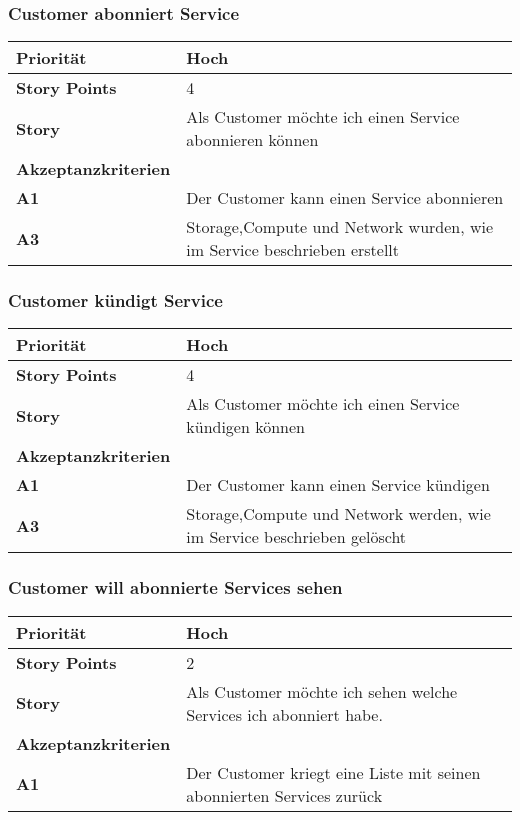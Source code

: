  \subsubsection{Customer abonniert Service}
\begin{tabularx}{\linewidth}{l X}
  \textbf{Priorität} & Hoch\\
  \hline
  \textbf{Story Points} & 4\\
  \hline
  \textbf{Story}& Als Customer möchte ich einen Service abonnieren können\\
  \hline
    \textbf{Akzeptanzkriterien} & \\
    \hline
  \textbf{A1} & Der Customer kann einen Service abonnieren\\
  \hline
    \textbf{A3} & Storage,Compute und Network wurden, wie im Service beschrieben erstellt\\
  \hline  
     \end{tabularx}

 

 \subsubsection{Customer kündigt Service}
 \begin{tabularx}{\linewidth}{l X}
     \textbf{Priorität} & Hoch\\
  \hline
  \textbf{Story Points} & 4\\
  \hline
  \textbf{Story}& Als Customer möchte ich einen Service kündigen können\\
  \hline
    \textbf{Akzeptanzkriterien} & \\
    \hline
  \textbf{A1} & Der Customer kann einen Service kündigen\\
  \hline
    \textbf{A3} & Storage,Compute und Network werden, wie im Service beschrieben gelöscht\\
  \hline
   \end{tabularx}

\subsubsection{Customer will abonnierte Services sehen}
\begin{tabularx}{\linewidth}{l X}
  \textbf{Priorität} & Hoch\\
  \hline
  \textbf{Story Points} & 2\\
  \hline
  \textbf{Story}& Als Customer möchte ich sehen welche Services ich abonniert habe.\\
  \hline
    \textbf{Akzeptanzkriterien} & \\
    \hline
  \textbf{A1} & Der Customer kriegt eine Liste mit seinen abonnierten Services zurück\\
  \hline
   \end{tabularx}
   
